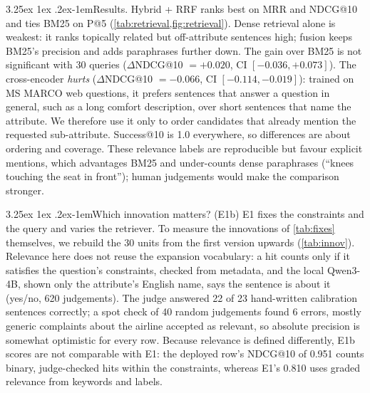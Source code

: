 \documentclass[10pt,twocolumn,a4paper]{article}
\makeatletter
\renewcommand\paragraph{\@startsection{paragraph}{4}{\parindent}%
  {3.25ex \@plus 1ex \@minus .2ex}{-1em}{\normalfont\normalsize\bfseries}}
\makeatother
\begin{document}
\paragraph{Results.} Hybrid + RRF ranks best on MRR and NDCG@10 and ties BM25 on P@5 (\cref{tab:retrieval,fig:retrieval}).
Dense retrieval alone is weakest: it ranks topically related but off-attribute sentences high; fusion keeps BM25's
precision and adds paraphrases further down. The gain over BM25 is not significant with 30 queries
($\Delta$NDCG@10 $=+0.020$, CI $[-0.036,+0.073]$). The cross-encoder \emph{hurts} ($\Delta$NDCG@10 $=-0.066$, CI
$[-0.114,-0.019]$): trained on MS MARCO web questions, it prefers sentences that answer a question in general, such as
a long comfort description, over short sentences that name the attribute. We therefore use it only to order candidates
that already mention the requested sub-attribute. Success@10 is 1.0 everywhere, so differences are about ordering and
coverage. These relevance labels are reproducible but favour explicit mentions, which advantages BM25 and under-counts dense
paraphrases (``knees touching the seat in front''); human judgements would make the comparison stronger.

\paragraph{Which innovation matters? (E1b)} E1 fixes the constraints and the query and varies the retriever. To
measure the innovations of \cref{tab:fixes} themselves, we rebuild the 30 units from the first version upwards
(\cref{tab:innov}). Relevance here does not reuse the expansion vocabulary: a hit counts only if it satisfies the
question's constraints, checked from metadata, and the local Qwen3-4B, shown only the attribute's English name, says
the sentence is about it (yes/no, 620 judgements). The judge answered 22 of 23 hand-written calibration sentences
correctly; a spot check of 40 random judgements found 6 errors, mostly generic complaints about the airline accepted as
relevant, so absolute precision is somewhat optimistic for every row. Because relevance is defined differently, E1b scores are
not comparable with E1: the deployed row's NDCG@10 of 0.951 counts binary, judge-checked hits within the constraints,
whereas E1's 0.810 uses graded relevance from keywords and labels.
\end{document}
